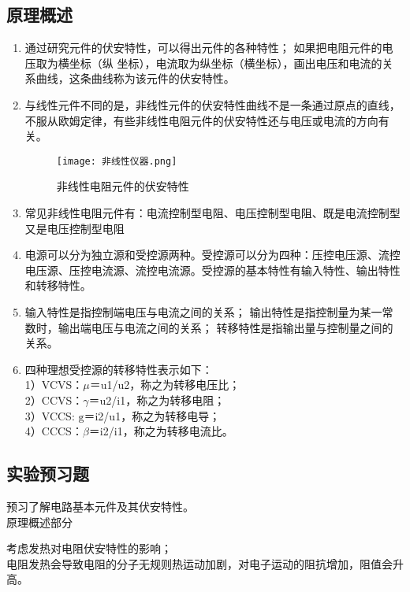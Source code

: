 \documentclass[dvipsnames, svgnames,a4paper,11pt]{article}
\begin{document}
	\subsection{原理概述}
	\begin{enumerate}
		\item 通过研究元件的伏安特性，可以得出元件的各种特性； 如果把电阻元件的电压取为横坐标（纵
		坐标），电流取为纵坐标（横坐标），画出电压和电流的关系曲线，这条曲线称为该元件的伏安特性。
		\item 与线性元件不同的是，非线性元件的伏安特性曲线不是一条通过原点的直线，不服从欧姆定律，有些非线性电阻元件的伏安特性还与电压或电流的方向有关。
		\begin{figure}[htbp]
			\centering
			\texttt{[image: 非线性仪器.png]}
			\caption{非线性电阻元件的伏安特性}
		\end{figure}
		\item 常见非线性电阻元件有：电流控制型电阻、电压控制型电阻、既是电流控制型又是电压控制型电阻
		\item 电源可以分为独立源和受控源两种。受控源可以分为四种：压控电压源、流控电压源、压控电流源、流控电流源。受控源的基本特性有输入特性、输出特性和转移特性。 
		\item 输入特性是指控制端电压与电流之间的关系； 输出特性是指控制量为某一常数时，输出端电压与电流之间的关系； 转移特性是指输出量与控制量之间的关系。
		\item 四种理想受控源的转移特性表示如下：\\
		1）VCVS：$\mu$＝u1/u2，称之为转移电压比；\\
		2）CCVS：$\gamma$＝u2/i1，称之为转移电阻；\\
		3）VCCS: $\mathrm{g}$＝i2/u1，称之为转移电导；\\
		4）CCCS：$\beta$＝i2/i1，称之为转移电流比。
		
	\end{enumerate}
	
	
	
	\subsection{实验预习题}
	
	\begin{question}
		预习了解电路基本元件及其伏安特性。\\原理概述部分
	\end{question}
	
	\begin{question}
		考虑发热对电阻伏安特性的影响；\\
		电阻发热会导致电阻的分子无规则热运动加剧，对电子运动的阻抗增加，阻值会升高。
	\end{question}
	
\end{document}
